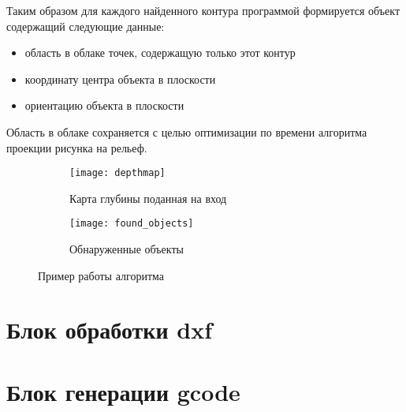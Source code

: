         Таким образом для каждого найденного контура программой формируется объект содержащий следующие данные:
        \begin{itemize}
            \item область в облаке точек, содержащую только этот контур
            \item координату центра объекта в плоскости
            \item ориентацию объекта в плоскости
        \end{itemize}
        Область в облаке сохраняется с целью оптимизации по времени алгоритма проекции рисунка на рельеф.
        
        \begin{figure}[H]
            \begin{subfigure}{0.5\linewidth}
                \texttt{[image: depthmap]}
                \caption{Карта глубины поданная на вход}
            \end{subfigure}
            \begin{subfigure}{0.5\linewidth}
                \texttt{[image: found\_objects]}
                \caption{Обнаруженные объекты}
            \end{subfigure}
            \caption{Пример работы алгоритма}
        \end{figure}
        
    \section{Блок обработки dxf}
    
    \section{Блок генерации gcode}